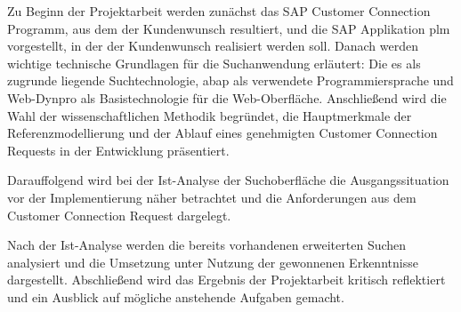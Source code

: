 Zu Beginn der Projektarbeit werden zunächst das SAP Customer Connection Programm, aus dem der Kundenwunsch resultiert, und die SAP Applikation \ac{plm} vorgestellt, in der der Kundenwunsch realisiert werden soll. Danach werden wichtige technische Grundlagen für die Suchanwendung erläutert: Die \ac{es} als zugrunde liegende Suchtechnologie, \acs{abap} als verwendete Programmiersprache und Web-Dynpro als Basistechnologie für die Web-Oberfläche. Anschließend wird die Wahl der wissenschaftlichen Methodik begründet, die Hauptmerkmale der Referenzmodellierung und der Ablauf eines genehmigten Customer Connection Requests in der Entwicklung präsentiert. 

Darauffolgend wird bei der Ist-Analyse der Suchoberfläche die Ausgangssituation vor der Implementierung näher betrachtet und die Anforderungen aus dem Customer Connection Request dargelegt. 

Nach der Ist-Analyse werden die bereits vorhandenen erweiterten Suchen analysiert und die Umsetzung unter Nutzung der gewonnenen Erkenntnisse dargestellt. Abschließend wird das Ergebnis der Projektarbeit kritisch reflektiert und ein Ausblick auf mögliche anstehende Aufgaben gemacht. 
